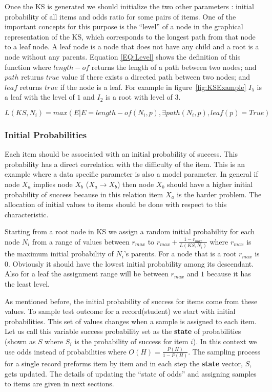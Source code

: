 Once the KS is generated we should initialize the two other parameters : initial probability of all items and odds ratio for some pairs of items. One of the important concepts for this purpose is the ``level'' of a node in the graphical representation of the KS, which corresponds to the longest path from that node to a leaf node. A leaf node is a node that does not have any child and a root is a node without any parents. Equation \ref{EQ:Level} shows the definition of this function where $length-of$ returns the length of a path between two nodes; and $path$ returns $true$ value if there exists a directed path between two nodes; and $leaf$ returns $true$ if the node is a leaf.  For example in figure~\ref{fig:KSExample} $I_{5}$ is a leaf with the level of $1$ and $I_{2}$ is a root with level of $3$.

\begin{equation}
L(KS,N_{i}) = max(E|E=length-of(N_{i},p)  ,  \exists path(N_{i},p)  , leaf(p)=True)
\label{EQ:Level}
\end{equation}

\subsubsection{Initial Probabilities}

Each item should be associated with an initial probability of success. This probability has a direct correlation with the difficulty of the item. This is an example where a data specific parameter is also a model parameter. In general if node $X_a$ implies node $X_b$ ($X_a \rightarrow X_b$) then node $X_b$ should have a higher initial probability of success because in this relation item $X_a$ is the harder problem. The allocation of initial values to items should be done with respect to this characteristic. 

Starting from a root node in KS we assign a random initial probability for each node $N_{i}$ from a range of values between $r_{max}$ to $r_{max}+\frac{1-r_{max}}{L(KS,N_{i})}$ where $r_{max}$ is the maximum initial probability of $N_{i}$'s parents. For a node that is a root $r_{max}$ is $0$. Obviously it should have the lowest initial probability among its descendant. Also for a leaf the assignment range will be between $r_{max}$ and $1$ because it has the least level. 


As mentioned before, the initial probability of success for items come from these values. To sample test outcome for a record(student) we start with initial probabilities. This set of values changes when a sample is assigned to each item. Let us call this variable success probability set as the \textbf{state} of probabilities (shown as $S$ where $S_i$ is the probability of success for item $i$). In this context we use odds instead of probabilities where $O(H) = \frac{P(H)}{1-P(H)}$. The sampling process for a single record preforms item by item and in each step the \textbf{state} vector, $S$, gets updated. The details of updating the ``state of odds'' and assigning samples to items are given in next sections.

